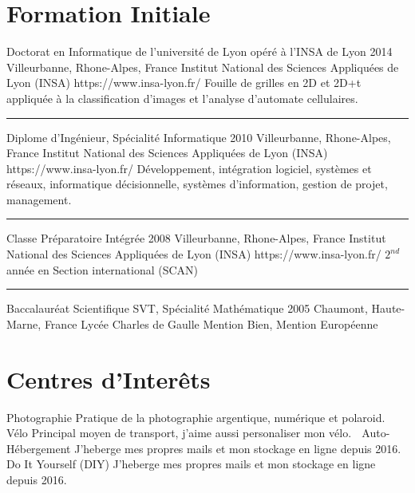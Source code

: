 \documentclass[singlesided,
  paper=a4,
  fontsize=10pt
]{resume}
\begin{document}
{  \section[\fa{graduation-cap}]{Formation Initiale}
    \schooldiploma
      {Doctorat en Informatique de l'université de Lyon opéré à l'INSA de Lyon}
      {2014}
      {Villeurbanne, Rhone-Alpes, France}
      {Institut National des Sciences Appliquées de Lyon (INSA)}
      {https://www.insa-lyon.fr/}
      {
Fouille de grilles en 2D et 2D+t appliquée à la classification d'images et
l'analyse d'automate cellulaires.}
    \textcolor{lightgray}{\rule{\linewidth}{0.25pt}}
    \schooldiploma
      {Diplome d'Ingénieur, Spécialité Informatique}
      {2010}
      {Villeurbanne, Rhone-Alpes, France}
      {Institut National des Sciences Appliquées de Lyon (INSA)}
      {https://www.insa-lyon.fr/}
      {
Développement, intégration logiciel, systèmes et réseaux, informatique
décisionnelle, systèmes d'information, gestion de projet, management.}
    \textcolor{lightgray}{\rule{\linewidth}{0.25pt}}
    \schooldiploma
      {Classe Préparatoire Intégrée}
      {2008}
      {Villeurbanne, Rhone-Alpes, France}
      {Institut National des Sciences Appliquées de Lyon (INSA)}
      {https://www.insa-lyon.fr/}
      {
$2^{nd}$ année en Section international (SCAN)}
    \textcolor{lightgray}{\rule{\linewidth}{0.25pt}}
    \schooldiploma
      {Baccalauréat Scientifique SVT, Spécialité Mathématique}
      {2005}
      {Chaumont, Haute-Marne, France}
      {Lycée Charles de Gaulle}
      {}
      {
Mention Bien, Mention Européenne}
  \section[\nerdfont]{Centres d'Interêts}
  \interest%
    {Photographie}%
    {Pratique de la photographie argentique, numérique et polaroid.}
    {\nerdfont}
  \interest%
    {Vélo}%
    {Principal moyen de transport, j'aime aussi personaliser mon vélo.}
    {\nerdfont}
  \interest%
    {Auto-Hébergement}%
    {J'heberge mes propres mails et mon stockage en ligne depuis 2016.}
    {\nerdfont}
  \interest%
    {Do It Yourself (DIY)}%
    {J'heberge mes propres mails et mon stockage en ligne depuis 2016.}
    {\nerdfont}
}
\makebody
\end{document}
